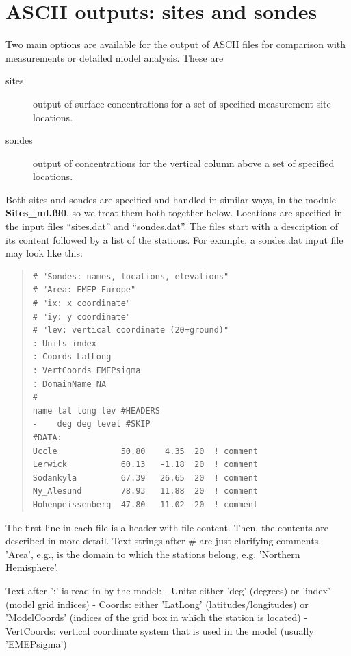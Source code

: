 \documentclass[a4paper,12pt]{report}
\begin{document}
\newpage
\section{ASCII outputs: sites and sondes}\label{sec:sitesonde}


Two main options are available for the output of ASCII files for comparison
with measurements or detailed model analysis. These are

\begin{description}
\item[sites]  

      output of surface concentrations for a set of specified
      measurement site locations.
\item[sondes] 

      output of concentrations for the vertical column above
     a set of specified locations.
\end{description}

Both sites and sondes are specified and handled in similar ways, in
the module {\bf Sites\_ml.f90}, so we treat them both together below.
Locations are specified in the input files ``sites.dat'' and ``sondes.dat''. 
The files start with a description of its content
followed by a list of the stations. For example, a sondes.dat input file
may look like this:

\begin{small}
\begin{quote}
\begin{verbatim}
# "Sondes: names, locations, elevations"
# "Area: EMEP-Europe"
# "ix: x coordinate"
# "iy: y coordinate"
# "lev: vertical coordinate (20=ground)"
: Units index
: Coords LatLong
: VertCoords EMEPsigma
: DomainName NA
#
name lat long lev #HEADERS
-    deg deg level #SKIP
#DATA:
Uccle             50.80    4.35  20  ! comment
Lerwick           60.13   -1.18  20  ! comment
Sodankyla         67.39   26.65  20  ! comment
Ny_Alesund        78.93   11.88  20  ! comment
Hohenpeissenberg  47.80   11.02  20  ! comment
\end{verbatim}

\end{quote}
\end{small}


The first line in each file is a header with file content.
Then, the contents are described in more detail. Text strings after
\# are just clarifying comments. 'Area', e.g., is the domain to which
the stations belong, e.g. 'Northern Hemisphere'.

Text after ':' is read in by the model:\newline
- Units: either 'deg' (degrees) or 'index' (model grid indices)\newline
- Coords: either 'LatLong' (latitudes/longitudes) or 'ModelCoords'
(indices of the grid box in which the station is located)\newline
- VertCoords: vertical coordinate system that is used in the model (usually
'EMEPsigma')\newline
\end{document}
